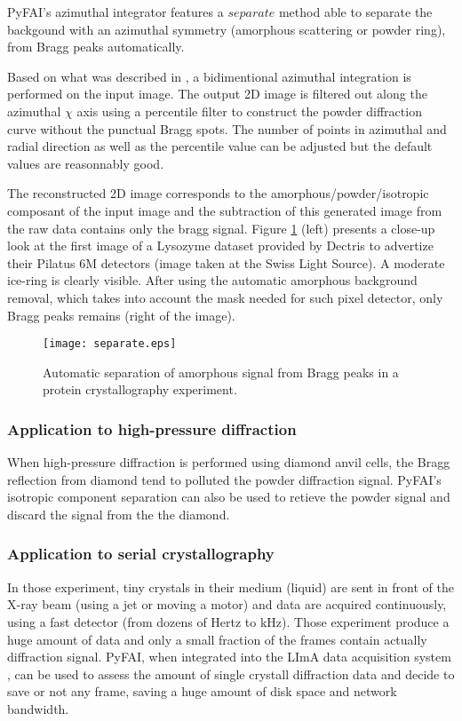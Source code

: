 \documentclass[preprint]{iucr}
\begin{document}
PyFAI's azimuthal integrator features a $separate$ method able to separate
the backgound with an azimuthal symmetry (amorphous scattering or powder ring),
from Bragg peaks automatically.

Based on what was described in \cite{PyFAI_PDJ}, a bidimentional azimuthal
integration is performed on the input image.
The output 2D image is filtered out along the azimuthal $\chi$ axis using a
percentile filter to construct the powder diffraction curve without the punctual
Bragg spots.
The number of points in azimuthal and radial direction as well as
the percentile value can be adjusted but the default values are reasonnably
good.

The reconstructed 2D image corresponds to the amorphous/powder/isotropic
composant of the input image and the subtraction of this generated image from
the raw data contains only the bragg signal.
Figure \ref{separate} (left)
presents a close-up look at the first image of a Lysozyme dataset provided by Dectris to
advertize their Pilatus 6M detectors (image taken at the Swiss Light Source). A
moderate ice-ring is clearly visible. After using the automatic amorphous
background removal, which takes into account the mask needed for such pixel
detector, only Bragg peaks remains (right of the image).

\begin{figure}
\label{separate}
\begin{center}
\texttt{[image: separate.eps]}
\caption{Automatic separation of amorphous signal from Bragg peaks in a
protein crystallography experiment.}
\end{center}
\end{figure}

\subsubsection{Application to high-pressure diffraction}
When high-pressure diffraction is performed using diamond anvil cells, the Bragg
reflection from diamond tend to polluted the powder diffraction signal. PyFAI's
isotropic component separation can also be used to retieve the powder signal and
discard the signal from the the diamond.

\subsubsection{Application to serial crystallography}
In those experiment, tiny crystals in their medium (liquid) are sent in front of
the X-ray beam (using a jet or moving a motor) and data are acquired
continuously, using a fast detector (from dozens of Hertz to kHz).
Those experiment produce a huge amount of data and only a small fraction of the
frames contain actually diffraction signal.
PyFAI, when integrated into the LImA data acquisition system \cite{lima},
can be used to assess the amount of single crystall diffraction data and decide
to save or not any frame, saving a huge amount of disk space and network
bandwidth.
\end{document}
